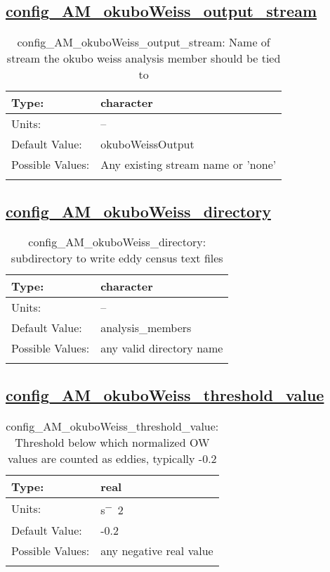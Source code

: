 \subsection[config\_AM\_okuboWeiss\_output\_stream]{\hyperref[sec:nm_tab_AM_okuboWeiss]{config\_AM\_okuboWeiss\_output\_stream}}
\label{subsec:nm_sec_config_AM_okuboWeiss_output_stream}
\begin{center}
\begin{longtable}{| p{2.0in} || p{4.0in} |}
    \hline
    Type: & character \\
    \hline
    Units: & -- \\
    \hline
    Default Value: & okuboWeissOutput \\
    \hline
    Possible Values: & Any existing stream name or 'none' \\
    \hline
    \caption{config\_AM\_okuboWeiss\_output\_stream: Name of stream the okubo weiss analysis member should be tied to}
\end{longtable}
\end{center}
\subsection[config\_AM\_okuboWeiss\_directory]{\hyperref[sec:nm_tab_AM_okuboWeiss]{config\_AM\_okuboWeiss\_directory}}
\label{subsec:nm_sec_config_AM_okuboWeiss_directory}
\begin{center}
\begin{longtable}{| p{2.0in} || p{4.0in} |}
    \hline
    Type: & character \\
    \hline
    Units: & -- \\
    \hline
    Default Value: & analysis\_members \\
    \hline
    Possible Values: & any valid directory name \\
    \hline
    \caption{config\_AM\_okuboWeiss\_directory: subdirectory to write eddy census text files}
\end{longtable}
\end{center}
\subsection[config\_AM\_okuboWeiss\_threshold\_value]{\hyperref[sec:nm_tab_AM_okuboWeiss]{config\_AM\_okuboWeiss\_threshold\_value}}
\label{subsec:nm_sec_config_AM_okuboWeiss_threshold_value}
\begin{center}
\begin{longtable}{| p{2.0in} || p{4.0in} |}
    \hline
    Type: & real \\
    \hline
    Units: & \si{s^-2} \\
    \hline
    Default Value: & -0.2 \\
    \hline
    Possible Values: & any negative real value \\
    \hline
    \caption{config\_AM\_okuboWeiss\_threshold\_value: Threshold below which normalized OW values are counted as eddies, typically -0.2}
\end{longtable}
\end{center}
